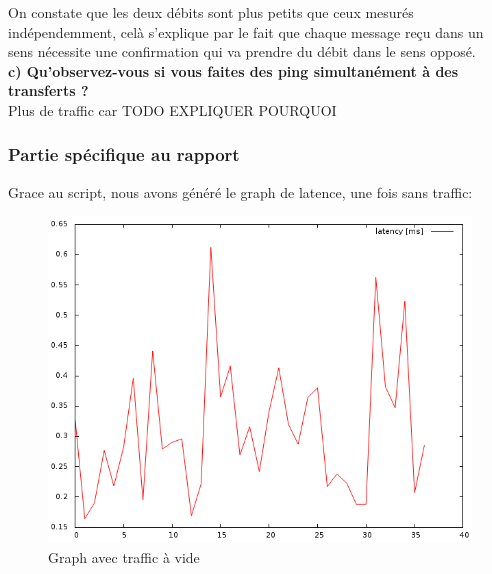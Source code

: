 \documentclass{article}
\begin{document}
On constate que les deux débits sont plus petits que ceux mesurés indépendemment, celà s'explique par le fait que chaque message reçu dans un sens nécessite une confirmation qui va prendre du débit dans le sens opposé.
\\

\textbf{c) Qu'observez-vous si vous faites des ping simultanément à des transferts ?}\\
Plus de traffic car TODO EXPLIQUER POURQUOI

\subsubsection{Partie spécifique au rapport}
Grace au script, nous avons généré le graph de latence, une fois sans traffic:
\begin{figure}[h]
  \centering
  \includegraphics[width=\linewidth]{./captures/6-plot.png}
  \caption{Graph avec traffic à vide}
  \label{fig:token-bucket}
\end{figure}
\newpage
\end{document}
